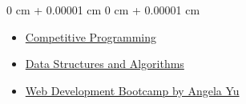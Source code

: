 \documentclass[10pt, letterpaper]{article}
\newenvironment{highlights}{
    \begin{itemize}[
        topsep=0.10 cm,
        parsep=0.10 cm,
        partopsep=0pt,
        itemsep=0pt,
        leftmargin=0 cm + 10pt
    ]
}{
    \end{itemize}
} %
\newenvironment{onecolentry}{
    \begin{adjustwidth}{
        0 cm + 0.00001 cm
    }{
        0 cm + 0.00001 cm
    }
}{
    \end{adjustwidth}
} %
\begin{document}
        \vspace{0.10 cm}
        \begin{onecolentry}
            \begin{highlights}
                \item \href{https://media.geeksforgeeks.org/courses/certificates/62ebd30c9341d6bc36192dd9699b8ba8.pdf}{Competitive Programming}
                \item \href{https://media.geeksforgeeks.org/courses/certificates/d4c0ceed0997b8fab4e01b8ad6b7272f.pdf}{Data Structures and Algorithms}
                \item \href{https://www.udemy.com/certificate/UC-e786e6e9-4ea7-42f6-ae51-1098428f9c62/}{Web Development Bootcamp by Angela Yu}
            \end{highlights}
        \end{onecolentry}
\end{document}
